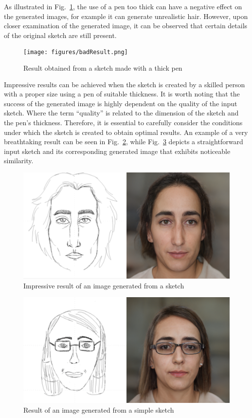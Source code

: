\noindent As illustrated in Fig.~\ref{fig:result thick pen}, the use of a pen too thick can have a negative effect on the generated images, for example it can generate unrealistic hair. However, upon closer examination of the generated image, it can be observed that certain details of the original sketch are still present. 
\begin{figure}[htbp]
  \centering
  \texttt{[image: figures/badResult.png]}
  \caption{Result obtained from a sketch made with a thick pen}
  \label{fig:result thick pen}
\end{figure}
%

\noindent Impressive results can be achieved when the sketch is created by a skilled person with a proper size using a pen of suitable thickness. It is worth noting that the success of the generated image is highly dependent on the quality of the input sketch. Where the term “quality” is related to the dimension of the sketch and the pen's thickness.
Therefore, it is essential to carefully consider the conditions under which the sketch is created to obtain optimal results. An example of a very breathtaking result can be seen in Fig.~\ref{fig:impressive result}, while Fig.~\ref{fig:result simple sketch} depicts a straightforward input sketch and its corresponding generated image that exhibits noticeable similarity.
\begin{figure}[htbp]
  \centering
  \includegraphics[scale=0.15]{figures/goodResult.png}
  \caption{Impressive result of an image generated from a sketch}
  \label{fig:impressive result}
\end{figure}
\begin{figure}[htbp]
  \centering
  \includegraphics[scale=0.25]{figures/goodResult-simpleSketch.png}
  \caption{Result of an image generated from a simple sketch}
  \label{fig:result simple sketch}
\end{figure}
%

